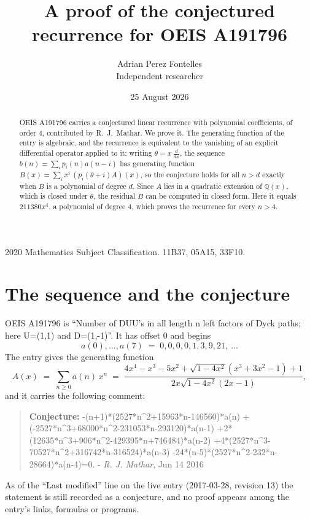 \documentclass[11pt,a4paper]{article}
\title{A proof of the conjectured recurrence for OEIS A191796}
\author{Adrian Perez Fontelles\\ \small Independent researcher}
\date{25 August 2026}
\theoremstyle{plain}
\theoremstyle{definition}
\begin{document}
\maketitle

\begin{abstract}
OEIS A191796 carries a conjectured linear recurrence with polynomial coefficients, of
order 4, contributed by R.~J.~Mathar. We prove it. The generating function of the
entry is algebraic, and the recurrence is equivalent to the vanishing of an explicit
differential operator applied to it: writing $\theta=x\,\frac{d}{dx}$, the sequence
$b(n)=\sum_{i}p_{i}(n)a(n-i)$ has generating function
$B(x)=\sum_{i}x^{i}\,(p_{i}(\theta+i)A)(x)$, so the conjecture holds for all $n>d$ exactly
when $B$ is a polynomial of degree $d$. Since $A$ lies in a quadratic extension of
$\mathbb{Q}(x)$, which is closed under $\theta$, the residual $B$ can be computed in
closed form. Here it equals $211380 x^{4}$, a polynomial of degree $4$, which proves
the recurrence for every $n>4$.
\end{abstract}

\noindent\small 2020 Mathematics Subject Classification. 11B37, 05A15, 33F10.\normalsize

\section{The sequence and the conjecture}

OEIS A191796 is ``Number of DUU's in all length n left factors of Dyck paths; here U=(1,1) and D=(1,-1)''. It has offset $0$ and begins
\[
a(0),\dots,a(7)\;=\;0, 0, 0, 0, 1, 3, 9, 21,\ \dots
\]
The entry gives the generating function
\begin{equation}\label{eq:gf}
A(x)\;=\;\sum_{n\ge 0} a(n)\,x^{n}\;=\;\frac{4 x^{4} - x^{3} - 5 x^{2} + \sqrt{1 - 4 x^{2}} \left(x^{3} + 3 x^{2} - 1\right) + 1}{2 x \sqrt{1 - 4 x^{2}} \left(2 x - 1\right)} ,
\end{equation}
and it carries the following comment:
\begin{quote}\small
\textbf{Conjecture:} -(n+1)*(2527*n\^{}2+15963*n-146560)*a(n) +(-2527*n\^{}3+68000*n\^{}2-231053*n-293120)*a(n-1) +2*(12635*n\^{}3+906*n\^{}2-429395*n+746484)*a(n-2) +4*(2527*n\^{}3-70527*n\^{}2+316742*n-316524)*a(n-3) -24*(n-5)*(2527*n\^{}2-232*n-28664)*a(n-4)=0. - \emph{R. J. Mathar}, Jun 14 2016
\end{quote}
As of the ``Last modified'' line on the live entry (2017-03-28, revision 13) the
statement is still recorded as a conjecture, and no proof appears among the entry's links,
formulas or programs.
\end{document}
